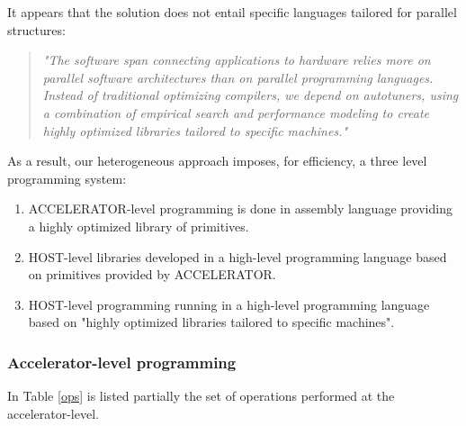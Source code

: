 
It appears that the solution does not entail specific languages tailored for parallel structures:
{\small
\begin{quote}
{\em "The software span connecting applications to hardware relies more on parallel software architectures than on parallel programming languages. Instead of traditional optimizing compilers, we depend on autotuners, using a combination of empirical search and performance modeling to create highly optimized libraries tailored to specific machines."} \cite{Asanovic09}
\end{quote}
}

As a result, our heterogeneous approach imposes, for efficiency, a three level programming system:
\begin{enumerate}
    \item ACCELERATOR-level programming is done in assembly language providing a highly optimized library of primitives.
    \item HOST-level libraries  developed  in a high-level programming language  based on primitives provided by ACCELERATOR.
    \item HOST-level programming running  in a high-level programming language based on "highly optimized libraries tailored to specific machines".
\end{enumerate}

\subsubsection{Accelerator-level programming}

In Table \ref{ops} is listed partially the set of operations performed at the accelerator-level.


